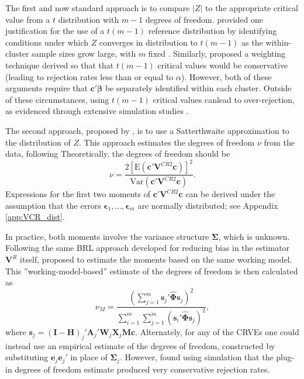 \documentclass[12pt]{article}
\newcommand{\E}{\text{E}}
\newcommand{\Var}{\text{Var}}
\newcommand{\bm}{\mathbf}
\newcommand{\bs}{\boldsymbol}
\begin{document}
The first and now standard approach is to compare $|Z|$ to the appropriate critical value from a $t$ distribution with $m - 1$ degrees of freedom. 
\citet{Hansen2007asymptotic} provided one justification for the use of a $t(m-1)$ reference distribution by identifying conditions under which $Z$ converges in distribution to $t(m-1)$ as the within-cluster sample sizes grow large, with $m$ fixed \citep[see also]{Donald2007inference}. Similarly,
\citet{Ibragimov2010tstatistic} proposed a weighting technique derived so that that $t(m-1)$ critical values would be conservative (leading to rejection rates less than or equal to $\alpha$). However, both of these arguments require that $\bm{c}'\bs\beta$ be separately identified within each cluster. 
Outside of these circumstances, using $t(m-1)$ critical values canlead to over-rejection, as evidenced through extensive simulation studies \citep{Cameron2015practitioners}. 

The second approach, proposed by \citet{McCaffrey2001generalizations}, is to use a Satterthwaite approximation \citep{Satterthwaite1946approximate} to the distribution of $Z$. This approach estimates the degrees of freedom $\nu$ from the data, following
Theoretically, the degrees of freedom should be 
\begin{equation}
\label{eq:nu_Satterthwaite}
\nu = \frac{2\left[\E\left(\bm{c}'\bm{V}^{CR2}\bm{c}\right)\right]^2}{\Var\left(\bm{c}'\bm{V}^{CR2}\bm{c}\right)}.
\end{equation}
Expressions for the first two moments of $\bm{c}'\bm{V}^{CR2}\bm{c}$ can be derived under the assumption that the errors $\bs\epsilon_1,...,\bs\epsilon_m$ are normally distributed; see Appendix \ref{app:VCR_dist}. 

In practice, both moments involve the variance structure $\bs\Sigma$, which is unknown. Following the same BRL approach developed for reducing bias in the estimator $\bm{V}^{R}$ itself, \citet{McCaffrey2001generalizations} proposed to estimate the moments based on the same working model. This ''working-model-based'' estimate of the degrees of freedom is then calculated as 
\begin{equation}
\nu_{M} = \frac{\left(\sum_{j=1}^m \bm{s}_j' \hat{\bs\Phi} \bm{s}_j\right)^2}{\sum_{i=1}^m \sum_{j=1}^m \left(\bm{s}_i' \hat{\bs\Phi} \bm{s}_j\right)^2},
\end{equation}
where $\bm{s}_j = \left(\bm{I} - \bm{H}\right)_j'\bm{A}_j'\bm{W}_j\bm{X}_j\bm{M}\bm{c}$. 
Alternately, for any of the CRVEs one could instead use an empirical estimate of the degrees of freedom, constructed by substituting $\bm{e}_j \bm{e}_j'$ in place of $\bs\Sigma_j$. However, \citet{Bell2002bias} found using simulation that the plug-in degrees of freedom estimate produced very conservative rejection rates. 
\end{document}
